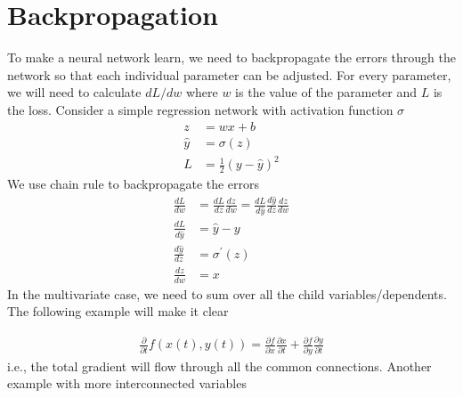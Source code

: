 \documentclass[../../deep_learning_notes.tex]{subfiles}
\begin{document}
\section{Backpropagation}
To make a neural network learn, we need to backpropagate the errors through the network so that each individual parameter can be adjusted. For every parameter, we will need to calculate $dL/dw$ where $w$ is the value of the parameter and $L$ is the loss. Consider a simple regression network with activation function $\sigma$
\begin{align*}
    z &= wx + b\\
    \hat{y} &= \sigma(z)\\
    L &= \frac{1}{2}(y - \hat{y})^{2}
\end{align*}
We use chain rule to backpropagate the errors
\begin{align*}
    \frac{dL}{dw} &= \frac{dL}{dz}\frac{dz}{dw} = \frac{dL}{d\hat{y}}\frac{d\hat{y}}{dz}\frac{dz}{dw}\\
    \frac{dL}{d\hat{y}} &= \hat{y} - y\\
    \frac{d\hat{y}}{dz} &= \sigma^{\prime}(z)\\
    \frac{dz}{dw} &= x
\end{align*}
In the multivariate case, we need to sum over all the child variables/dependents. The following example will make it clear\newline
\begin{center}
\end{center}
\begin{align*}
     \frac{\partial}{\partial t} f(x(t), y(t)) = \frac{\partial f}{\partial x}\frac{\partial x}{\partial t} + \frac{\partial f}{\partial y}\frac{\partial y}{\partial t}
\end{align*}
i.e., the total gradient will flow through all the common connections. Another example with more interconnected variables
\begin{center}
\end{center}
\end{document}
